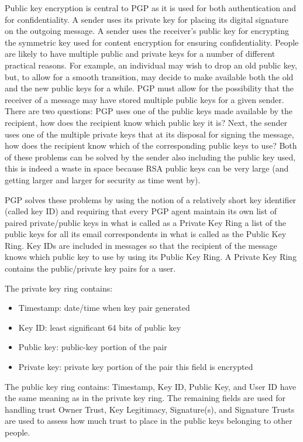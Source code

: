 Public key encryption is central to PGP as it is used for both authentication and for confidentiality. A sender uses its private key for placing its digital signature on the outgoing message. A sender uses the receiver's public key for encrypting the symmetric key used for
content encryption for ensuring confidentiality. People are likely to have multiple public and private keys for a number of different practical reasons. For example, an individual may wish to drop an old public key, but, to allow for a smooth transition, may decide to make available both the old and the new public keys for a while. PGP must allow for the possibility that the receiver of a message may have stored multiple public keys for a given sender. 
There are two questions: PGP uses one of the public keys made available by the recipient, how does the recipient know which public key it is? Next, the sender uses one of the multiple private keys that at its disposal for signing the message, how does the recipient know which of the corresponding public keys to use?  Both of these problems can be solved by the sender also including the public key used, this is indeed a waste in space because RSA public keys can be very large (and getting larger and larger for security as time went by).

PGP solves these problems by using the notion of a relatively short key identifier (called key ID) and requiring that every PGP agent maintain its own list of paired private/public keys in what is called as a Private Key Ring a list of the public keys for all its email correspondents in what is called as the Public Key Ring. Key IDs are included in messages so that the recipient of the message knows which public key to use by using its Public Key Ring. A Private Key Ring contains the public/private key pairs for a user.

The private key ring contains:
\begin{itemize}
	\item Timestamp: date/time when key pair generated
	\item Key ID: least significant 64 bits of public key
	\item Public key: public-key portion of the pair
	\item Private key: private key portion of the pair this field is encrypted
\end{itemize}

The public key ring contains: Timestamp, Key ID, Public Key, and User ID have the same meaning as in the private key ring. The remaining fields are used for handling trust Owner Trust, Key Legitimacy, Signature(s), and Signature Trusts are used to assess how much trust to place in the public keys belonging to other people.

